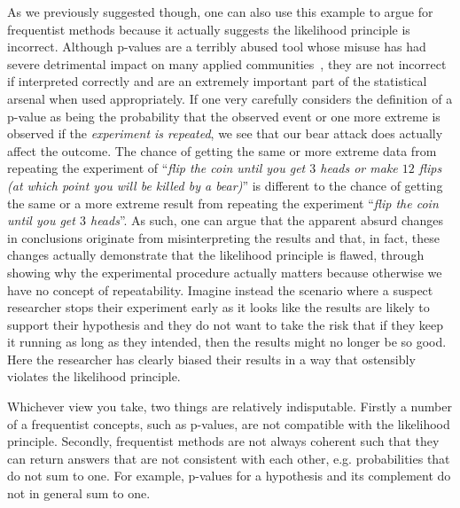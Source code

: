 As we previously suggested though, one can also use this example to argue for frequentist methods because it actually
suggests the likelihood principle is incorrect.  Although p-values are a terribly abused tool whose misuse has had
severe detrimental impact on many applied communities~\citep{goodman1999toward,ioannidis2005most}, they are not incorrect if 
interpreted correctly
and are an extremely important part of the statistical arsenal when used appropriately.  If one very carefully considers
the definition of a p-value as being the probability that the observed event or one more extreme is observed if the
\emph{experiment is repeated}, we see that our bear attack does actually affect the outcome.  The chance of getting the same
or more extreme data from repeating the experiment of ``\textit{flip the coin until you get $3$ heads or make $12$ flips (at which
	point you will be killed by a bear)}'' is different to the chance of getting the same or a more extreme result from
repeating the experiment ``\textit{flip the coin until you get $3$ heads}''.  As such, one can argue that the apparent absurd
changes in conclusions originate from misinterpreting the results and that, in fact, these changes actually demonstrate
that the likelihood principle is flawed, through showing why the experimental procedure actually matters because otherwise
we have no concept of repeatability.  Imagine instead the scenario where a suspect researcher stops their experiment
early as it looks like the results are likely to support their hypothesis and they do not want to take the risk that if they
keep it running as long as they intended, then the results might no longer be so good.  Here the researcher has clearly
biased their results in a way that ostensibly violates the likelihood principle.

Whichever view you take, two things are relatively indisputable.  Firstly a number of a frequentist concepts, such as p-values,
are not compatible with the likelihood principle.  Secondly, frequentist methods are not always coherent such that they can
return answers that are not consistent with each other, e.g. probabilities that do not sum to one.  For example, p-values
for a hypothesis and its complement do not in general sum to one.  

